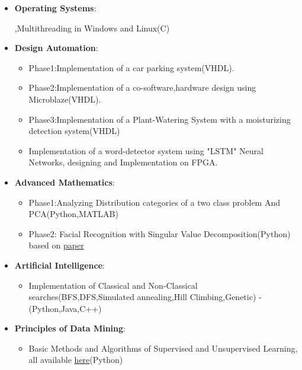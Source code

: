 \documentclass[letterpaper,MMMyyyy,nonstopmode]{simpleresumecv}
\begin{document}
\begin{Body}
\begin{itemize}
     \item \textbf{Operating Systems}:
     \begin{itemize}
       \itemMultiprocessing,Multithreading in Windows and Linux(C)
		\end{itemize}
	

	
	\item \textbf{Design Automation}:
		\begin{itemize}
		\item Phase1:Implementation of a car parking system(VHDL).
     	\item Phase2:Implementation of a co-software,hardware design using
     	      Microblaze(VHDL).
	    \item Phase3:Implementation of a Plant-Watering System with a moisturizing
	          detection system(VHDL)
	          
		\end{itemize}
		
			\begin{itemize}
		\item Implementation of a word-detector system using  "LSTM" Neural Networks, designing and Implementation on FPGA.
	          
		\end{itemize}
		
	
		
    \item \textbf{Advanced Mathematics}: 
	    \begin{itemize}
        \item Phase1:Analyzing Distribution categories of a two class  problem And PCA(Python,MATLAB)
		      \item Phase2:
     	     Facial Recognition with Singular Value Decomposition(Python)
     	     based on 	\href{https://link.springer.com/chapter/10.1007/978-1-4020-6264-3_26}{paper}
     \end{itemize}
      
   
       	  \item \textbf{Artificial Intelligence}: 
	    \begin{itemize}
        \item 
		  Implementation of Classical and Non-Classical searches(BFS,DFS,Simulated annealing,Hill Climbing,Genetic) - (Python,Java,C++)
     \end{itemize}
     
     
       	  \item \textbf{Principles of Data Mining}: 
	    \begin{itemize}
        \item 
	Basic Methods and Algorithms of Supervised and Unsupervised Learning, all available \href{https://github.com/Yasaman1997/DataMining_and_DataAnalysis/tree/master/DM_2018/HWS}{here}(Python)
     \end{itemize}
     

\end{itemize}
\end{Body}
\end{document}
